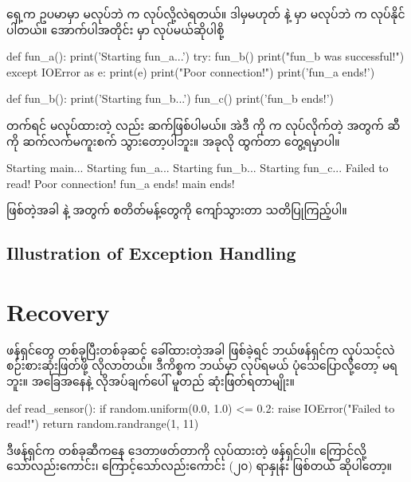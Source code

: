 ရှေ့က ဥပမာမှာ    မလုပ်ဘဲ  က  လုပ်လို့လဲရတယ်။ ဒါမှမဟုတ်  နဲ့  မှာ  မလုပ်ဘဲ  က လုပ်နိုင်ပါတယ်။ အောက်ပါအတိုင်း  မှာ  လုပ်မယ်ဆိုပါစို့ 

%
\begin{py}
def fun_a():
    print('Starting fun_a...')
    try:
        fun_b()
        print("fun_b was successful!")
    except IOError as e:
        print(e)
        print("Poor connection!")
    print('fun_a ends!')


def fun_b():
    print('Starting fun_b...')
    fun_c()
    print('fun_b ends!')
\end{py}
%
  တက်ရင်  မလုပ်ထားတဲ့  လည်း   ဆက်ဖြစ်ပါမယ်။ အဲဒီ  ကို  က  လုပ်လိုက်တဲ့ အတွက်  ဆီကို ဆက်လက်မကူးစက် သွားတော့ပါဘူး။  အခုလို ထွက်တာ တွေ့ရမှာပါ။
%
\begin{codetxt}
Starting main...
Starting fun_a...
Starting fun_b...
Starting fun_c...
Failed to read!
Poor connection!
fun_a ends!
main ends!
\end{codetxt}
%
  ဖြစ်တဲ့အခါ  နဲ့  အတွက်  စတိတ်မန့်တွေကို ကျော်သွားတာ သတိပြုကြည့်ပါ။

\subsection*{Illustration of Exception Handling}

\section{Recovery}
ဖန်ရှင်တွေ တစ်ခုပြီးတစ်ခုဆင့် ခေါ်ထားတဲ့အခါ  ဖြစ်ခဲ့ရင် ဘယ်ဖန်ရှင်က  လုပ်သင့်လဲ စဉ်းစားဆုံးဖြတ်ဖို့ လိုလာတယ်။ ဒီကိစ္စက ဘယ်မှာ  လုပ်ရမယ် ပုံသေပြောလို့တော့ မရဘူး။ အခြေအနေနဲ့ လိုအပ်ချက်ပေါ် မူတည် ဆုံးဖြတ်ရတာမျိုး။ 
%
%
\begin{py}
def read_sensor():
    if random.uniform(0.0, 1.0) <= 0.2:
        raise IOError("Failed to read!")
    return random.randrange(1, 11)
\end{py}
%
ဒီဖန်ရှင်က  တစ်ခုဆီကနေ ဒေတာဖတ်တာကို  လုပ်ထားတဲ့ ဖန်ရှင်ပါ။  ကြောင်လို့သော်လည်းကောင်း၊  ကြောင့်သော်လည်းကောင်း (၂၀) ရာနှုန်း  ဖြစ်တယ် ဆိုပါတော့။ 

